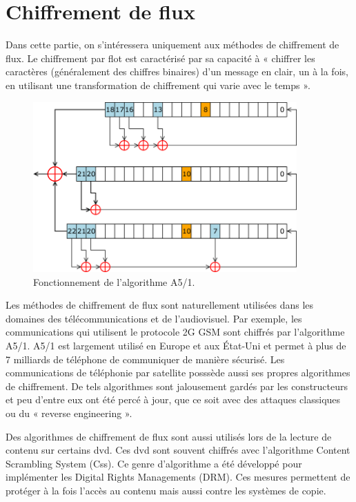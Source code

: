 \section{Chiffrement de flux}

Dans cette partie, on s'intéressera uniquement aux méthodes de chiffrement
de flux. Le chiffrement par flot est caractérisé par sa capacité à « chiffrer
les caractères (généralement des chiffres binaires) d'un message en clair, un à
la fois, en utilisant une transformation de chiffrement qui varie avec le
temps »\cite{appliedCrypto}.

\begin{figure}[!h]
	\centering
	\includegraphics[width=0.9\textwidth]{imgs/application/A5.png}
	\caption{Fonctionnement de l'algorithme A5/1.}
	\label{algoA5}
\end{figure}

Les méthodes de chiffrement de flux sont naturellement utilisées dans les
domaines des télécommunications et de l'audiovisuel. Par exemple, les
communications qui utilisent le protocole 2G GSM sont chiffrés par
l'algorithme A5/1. A5/1 est largement utilisé en Europe et aux État-Uni et
permet à plus de 7 milliards de téléphone de communiquer de manière
sécurisé\cite{7milliards}. Les communications de téléphonie par satellite
posssède aussi ses propres algorithmes de chiffrement. De tels algorithmes
sont jalousement gardés par les constructeurs et peu d'entre eux ont été percé à
jour, que ce soit avec des attaques classiques ou du « reverse engineering ».

Des algorithmes de chiffrement de flux sont aussi utilisés lors de la lecture
de contenu sur certains dvd. Ces dvd sont souvent chiffrés avec l'algorithme
Content Scrambling System (Css). Ce genre d'algorithme a été développé pour
implémenter les Digital Rights Managements (DRM). Ces mesures permettent de
protéger à la fois l'accès au contenu mais aussi contre les systèmes de copie.
